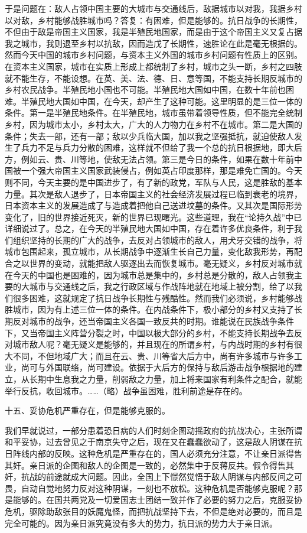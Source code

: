 于是问题在：敌人占领中国主要的大城市与交通线后，敌据城市以对我，我据乡村以对敌，乡村能够战胜城市吗？答复：有困难，但是能够的。抗日战争的长期性，不但由于敌是帝国主义国家，我是半殖民地国家，而是由于这个帝国主义又复占据我之城市，我则退至乡村以抗敌，因而造戊了长期性，速胜论在此是毫无根据的。然而今天中国的城市乡村问题，与资本主义外国的城市乡村问题有性质上的区别。在资本主义国家，城市在实质上形成上都统制了乡村，城市之头一断，乡村之四肢就不能生存，不能设想。在英、美、法、德、日、意等国，不能支持长期反城市的乡村农民战争。半殖民地小国也不可能。半殖民地大国如中国，在数十年前也困难。半殖民地大国如中国，在今天，却产生了这种可能。这里明显的是三位一体的条件。第一是半殖民地条件。在半殖民地，城市虽带着领导性质，但不能完全统制乡村，因为城市太小，乡村太大，广大的人力物力在乡村不在城市。第二是大国的条件；失去一部，还有一部；敌以少兵临大国，加以我之坚强抵抗，就迫使敌人发生了兵力不足与兵力分散的困难，这样就不但给了我一个总的抗日根据地，即大后方，例如云、贵、川等地，使敌无法占领。第三是今日的条件，如果在数十年前中国被一个强大帝国主义国家武装侵占，例如英占印度那样，那是难免亡国的。今天则不同，今天主要的是中国进步了，有了新的政党，军队与人民，这是胜敌的基本力量。其次是敌人退步了，日本帝国主义的社会经济发展过程已临到衰老的境界，日本资本主义的发展造成了与造成着把他自己送进坟墓的条件。又其次是国际形势变化了，旧的世界接近死灭，新的世界已现曙光。这些道理，我在“论持久战”中已详细说过了。总之，在今天的半殖民地大国如中国，存在着许多优良条件，利于我们组织坚持的长期的广大的战争，去反对占领城市的敌人，用犬牙交错的战争，将城市包围起来，孤立城市，从长期战争中逐渐生长自己力量，变化敌我形势，再配合之以世界的变动，就能把敌人驱逐出去而恢复城市。毫无疑义，乡村反对城市就在今天的中国也是困难的，因为城市总是集中的，乡村总是分散的，敌人占领我主要的大城市与交通线之后，我之行政区域与作战阵地就在地域上被分割，给了以我们很多困难，这就规定了抗日战争长期性与残酷性。然而我们必须说，乡村能够战胜城市，因为有上述三位一体的条件。在内战条件下，极小部分的乡村又支持了长期反对城市的战争，还当帝国主义各国一致反共的时期。谁能说在民族战争条件下，又当帝国主义阵营分裂之时，中国以极大部分的乡村，不能支持长期战争去反对城市敌人呢？毫无疑义是能够的，并且现在的所谓乡村，与内战时期的乡村有很大不同，不但地域广大；而且在云、贵、川等省大后方中，尚有许多城市与许多工业，尚可与外国联络，尚可建设。依据于大后方的保持与敌后游击战争根据地的建立，从长期中生息我之力量，削弱敌之力量，加上将来国家有利条件之配合，就能举行反抗，收回城市。……（略）战争虽困难，胜利前途是存在的。

十五、妥协危机严重存在，但是能够克服的。

我们早就说过，一部分患着恐日病的人们时刻企图动摇政府的抗战决心，主张所谓和平妥协，过去曾见之于南京失守之后，现在又在蠢蠢欲动了，这是敌人阴谋在抗日阵线内部的反映。这种危机是严重存在的，国人必须充分注意，不让亲日派得售其奸。亲日派的企图和敌人的企图是一致的，必然集中于反蒋反共。假令得售其奸，抗战的前途就成大问题。因此，全国上下憬然觉悟于敌人阴谋与内部反间之可畏，自动自觉地努力反对这种阴谋，一刻也不放松。这种危机是否能够克服呢？那是能够的。在国共两党及一切爱国志士团结一致并作了必要的努力之后，克服妥协危机，驱除助敌张目的妖魔鬼怪，而把抗战坚持下去，不但是绝对必要的，而且是完全可能的。因为亲日派究竟没有多大的势力，抗日派的势力大于亲日派。

